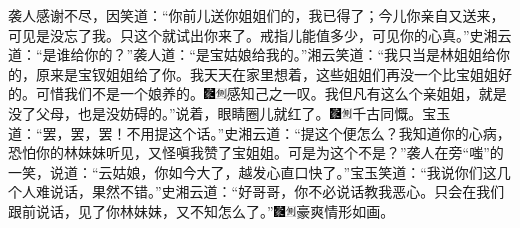 袭人感谢不尽，因笑道：``你前儿送你姐姐们的，我已得了；今儿你亲自又送来，可见是没忘了我。只这个就试出你来了。戒指儿能值多少，可见你的心真。''史湘云道：``是谁给你的？''袭人道：``是宝姑娘给我的。''湘云笑道：``我只当是林姐姐给你的，原来是宝钗姐姐给了你。我天天在家里想着，这些姐姐们再没一个比宝姐姐好的。可惜我们不是一个娘养的。{\includegraphics[width=3mm]{../Images/00006}\includegraphics[width=3mm]{../Images/00011}\footnotesize \kaishu 感知己之一叹。}我但凡有这么个亲姐姐，就是没了父母，也是没妨碍的。''说着，眼睛圈儿就红了。{\includegraphics[width=3mm]{../Images/00006}\includegraphics[width=3mm]{../Images/00011}\footnotesize \kaishu 千古同慨。}宝玉道：``罢，罢，罢！不用提这个话。''史湘云道：``提这个便怎么？我知道你的心病，恐怕你的林妹妹听见，又怪嗔我赞了宝姐姐。可是为这个不是？''袭人在旁``嗤''的一笑，说道：``云姑娘，你如今大了，越发心直口快了。''宝玉笑道：``我说你们这几个人难说话，果然不错。''史湘云道：``好哥哥，你不必说话教我恶心。只会在我们跟前说话，见了你林妹妹，又不知怎么了。''{\includegraphics[width=3mm]{../Images/00006}\includegraphics[width=3mm]{../Images/00011}\footnotesize \kaishu 豪爽情形如画。}

